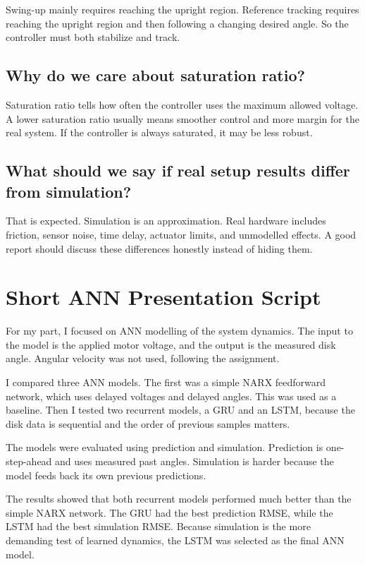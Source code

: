 \documentclass[11pt,a4paper]{article}
\begin{document}
Swing-up mainly requires reaching the upright region.
Reference tracking requires reaching the upright region and then following a changing desired angle.
So the controller must both stabilize and track.

\subsection*{Why do we care about saturation ratio?}

Saturation ratio tells how often the controller uses the maximum allowed voltage.
A lower saturation ratio usually means smoother control and more margin for the real system.
If the controller is always saturated, it may be less robust.

\subsection*{What should we say if real setup results differ from simulation?}

That is expected.
Simulation is an approximation.
Real hardware includes friction, sensor noise, time delay, actuator limits, and unmodelled effects.
A good report should discuss these differences honestly instead of hiding them.

\section{Short ANN Presentation Script}

For my part, I focused on ANN modelling of the system dynamics.
The input to the model is the applied motor voltage, and the output is the measured disk angle.
Angular velocity was not used, following the assignment.

I compared three ANN models.
The first was a simple NARX feedforward network, which uses delayed voltages and delayed angles.
This was used as a baseline.
Then I tested two recurrent models, a GRU and an LSTM, because the disk data is sequential and the order of previous samples matters.

The models were evaluated using prediction and simulation.
Prediction is one-step-ahead and uses measured past angles.
Simulation is harder because the model feeds back its own previous predictions.

The results showed that both recurrent models performed much better than the simple NARX network.
The GRU had the best prediction RMSE, while the LSTM had the best simulation RMSE.
Because simulation is the more demanding test of learned dynamics, the LSTM was selected as the final ANN model.
\end{document}
